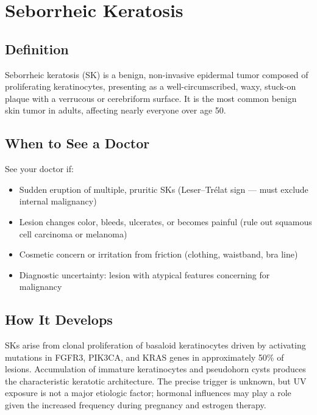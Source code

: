 \chapter{Seborrheic Keratosis}

\section*{Definition}
Seborrheic keratosis (SK) is a benign, non-invasive epidermal tumor composed of proliferating keratinocytes, presenting as a well-circumscribed, waxy, stuck-on plaque with a verrucous or cerebriform surface. It is the most common benign skin tumor in adults, affecting nearly everyone over age 50.

\section*{When to See a Doctor}
See your doctor if:
\begin{itemize}
  \item Sudden eruption of multiple, pruritic SKs (Leser--Tr\'elat sign --- must exclude internal malignancy)
  \item Lesion changes color, bleeds, ulcerates, or becomes painful (rule out squamous cell carcinoma or melanoma)
  \item Cosmetic concern or irritation from friction (clothing, waistband, bra line)
  \item Diagnostic uncertainty: lesion with atypical features concerning for malignancy
\end{itemize}

\section*{How It Develops}
SKs arise from clonal proliferation of basaloid keratinocytes driven by activating mutations in FGFR3, PIK3CA, and KRAS genes in approximately 50\% of lesions. Accumulation of immature keratinocytes and pseudohorn cysts produces the characteristic keratotic architecture. The precise trigger is unknown, but UV exposure is not a major etiologic factor; hormonal influences may play a role given the increased frequency during pregnancy and estrogen therapy.

